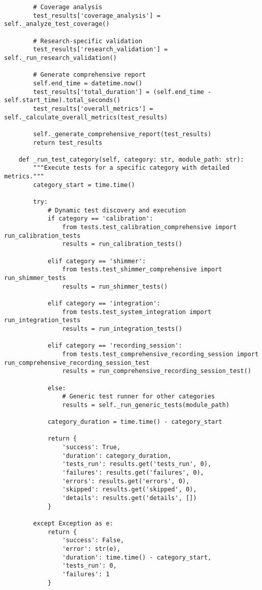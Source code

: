 \documentclass[12pt,a4paper]{article}
\begin{document}
\begin{verbatim}
        # Coverage analysis
        test_results['coverage_analysis'] = self._analyze_test_coverage()

        # Research-specific validation
        test_results['research_validation'] = self._run_research_validation()

        # Generate comprehensive report
        self.end_time = datetime.now()
        test_results['total_duration'] = (self.end_time - self.start_time).total_seconds()
        test_results['overall_metrics'] = self._calculate_overall_metrics(test_results)

        self._generate_comprehensive_report(test_results)
        return test_results

    def _run_test_category(self, category: str, module_path: str):
        """Execute tests for a specific category with detailed metrics."""
        category_start = time.time()

        try:
            # Dynamic test discovery and execution
            if category == 'calibration':
                from tests.test_calibration_comprehensive import run_calibration_tests
                results = run_calibration_tests()

            elif category == 'shimmer':
                from tests.test_shimmer_comprehensive import run_shimmer_tests
                results = run_shimmer_tests()

            elif category == 'integration':
                from tests.test_system_integration import run_integration_tests
                results = run_integration_tests()

            elif category == 'recording_session':
                from tests.test_comprehensive_recording_session import run_comprehensive_recording_session_test
                results = run_comprehensive_recording_session_test()

            else:
                # Generic test runner for other categories
                results = self._run_generic_tests(module_path)

            category_duration = time.time() - category_start

            return {
                'success': True,
                'duration': category_duration,
                'tests_run': results.get('tests_run', 0),
                'failures': results.get('failures', 0),
                'errors': results.get('errors', 0),
                'skipped': results.get('skipped', 0),
                'details': results.get('details', [])
            }

        except Exception as e:
            return {
                'success': False,
                'error': str(e),
                'duration': time.time() - category_start,
                'tests_run': 0,
                'failures': 1
            }
\end{verbatim}
\end{document}
